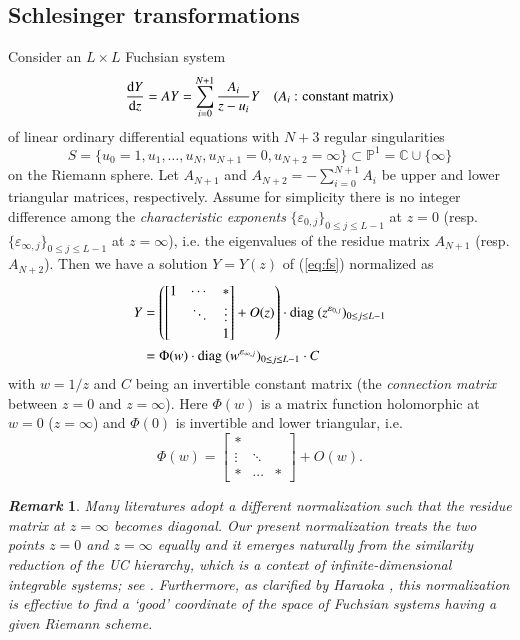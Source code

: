 \documentclass[12pt]{article}
\newtheorem{remark}[thm]{\it Remark}
\numberwithin{equation}{section}
\begin{document}
\subsection{Schlesinger transformations}
\label{subsect:st}

Consider an $L\times L$ Fuchsian system
\begin{equation} \label{eq:fs}
\frac{{\rm d} Y}{{\rm d} z}
=A Y
=\sum_{i=0}^{N+1} \frac{A_i}{z-u_i} Y
\quad
(A_i \text{ : constant matrix})
\end{equation}
of linear ordinary
differential equations
with 
$N+3$ regular singularities
\[
S=\{u_0=1, u_1,\ldots, u_N,u_{N+1}=0, u_{N+2}=\infty\}
\subset 
{\mathbb P}^1={\mathbb C} \cup \{\infty\}
\]
on the Riemann sphere.
Let
$A_{N+1}$ and $A_{N+2}=-\sum_{i=0}^{N+1} A_i$
be upper and lower triangular matrices, respectively.
Assume  
for simplicity
there is no integer difference among the 
{\it characteristic exponents} 
$\{{\varepsilon_{0,j}}\}_{0 \leq j \leq L-1}$ at $z=0$
(resp. $\{{\varepsilon_{\infty,j}}\}_{0 \leq j \leq L-1}$ at $z=\infty$),
i.e. the eigenvalues of the residue matrix $A_{N+1}$ (resp. $A_{N+2}$).
Then we have a solution 
$Y=Y(z)$ of (\ref{eq:fs}) normalized as 
\begin{align}
Y&=
\left(
\begin{bmatrix}
1 & \cdots &*\\  
&\ddots& \vdots \\
&&1
\end{bmatrix} 
+O(z)
\right)
\cdot
{\rm diag \ }  (z^{\varepsilon_{0,j}})_{0 \leq j \leq L-1}
\nonumber
\\ 
&=\Phi (w) \cdot {\rm diag \ }  (w^{\varepsilon_{\infty,j}})_{0 \leq j \leq L-1} \cdot C
\label{eq:fss}
\end{align}
with $w=1/z$ and
$C$ being an invertible constant matrix
(the {\it connection matrix} between $z=0$ and $z=\infty$).
Here $\Phi(w)$ is a matrix function holomorphic
at $w=0$ ($z=\infty$)
and $\Phi(0)$ is  invertible and lower triangular,
i.e.
\[
\Phi(w)
=
\begin{bmatrix}
* &  &\\  
 \vdots&\ddots& \\ 
*& \cdots&*
\end{bmatrix}
+O(w).
\]

\begin{remark}\rm
Many literatures adopt a different 
normalization such that the residue matrix at $z=\infty$ becomes diagonal.
Our present normalization
treats the two points $z=0$ and $z=\infty$ equally and it
emerges naturally from the similarity reduction of the UC hierarchy,
which is a context of infinite-dimensional integrable systems;
see \cite{tsu04, tsu12a, tsu14a}.
Furthermore, as clarified by Haraoka \cite{har12},
this normalization is effective to find a 
`good' coordinate of the space of Fuchsian systems having a given 
Riemann scheme.
\end{remark}
\end{document}
